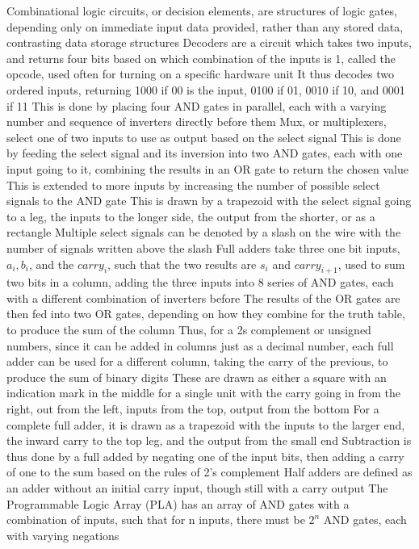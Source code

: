 \documentclass[11 pt, twoside]{article}
\newenvironment{outline*}
{
	\begin{outline}[enumerate]
	}
	{\end{outline}
}
\begin{document}
\begin{outline*}
\1 Combinational logic circuits, or decision elements, are structures of logic gates, depending only on immediate input data provided, rather than any stored data, contrasting data storage structures
\2 Decoders are a circuit which takes two inputs, and returns four bits based on which combination of the inputs is 1, called the opcode, used often for turning on a specific hardware unit
\3 It thus decodes two ordered inputs, returning 1000 if 00 is the input, 0100 if 01, 0010 if 10, and 0001 if 11
\3 This is done by placing four AND gates in parallel, each with a varying number and sequence of inverters directly before them
\2 Mux, or multiplexers, select one of two inputs to use as output based on the select signal
\3 This is done by feeding the select signal and its inversion into two AND gates, each with one input going to it, combining the results in an OR gate to return the chosen value
\3 This is extended to more inputs by increasing the number of possible select signals to the AND gate
\3 This is drawn by a trapezoid with the select signal going to a leg, the inputs to the longer side, the output from the shorter, or as a rectangle
\4 Multiple select signals can be denoted by a slash on the wire with the number of signals written above the slash
\2 Full adders take three one bit inputs, $a_i, b_i$, and the $carry_i$, such that the two results are $s_i$ and $carry_{i + 1}$, used to sum two bits in a column, adding the three inputs into 8 series of AND gates, each with a different combination of inverters before
\3 The results of the OR gates are then fed into two OR gates, depending on how they combine for the truth table, to produce the sum of the column
\3 Thus, for a 2s complement or unsigned numbers, since it can be added in columns just as a decimal number, each full adder can be used for a different column, taking the carry of the previous, to produce the sum of binary digits
\3 These are drawn as either a square with an indication mark in the middle for a single unit with the carry going in from the right, out from the left, inputs from the top, output from the bottom
\4 For a complete full adder, it is drawn as a trapezoid with the inputs to the larger end, the inward carry to the top leg, and the output from the small end
\3 Subtraction is thus done by a full added by negating one of the input bits, then adding a carry of one to the sum based on the rules of 2's complement
\3 Half adders are defined as an adder without an initial carry input, though still with a carry output
\2 The Programmable Logic Array (PLA) has an array of AND gates with a combination of inputs, such that for n inputs, there must be $2^n$ AND gates, each with varying negations

\end{outline*}
\end{document}
